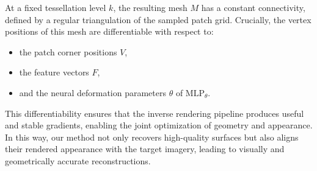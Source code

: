 At a fixed tessellation level $k$, the resulting mesh $M$ has a constant connectivity, defined by a regular triangulation of the sampled patch grid.  
Crucially, the vertex positions of this mesh are differentiable with respect to:
\begin{itemize}
    \item the patch corner positions $V$,
    \item the feature vectors $F$,
    \item and the neural deformation parameters $\theta$ of $\text{MLP}_\theta$.
\end{itemize}

This differentiability ensures that the inverse rendering pipeline produces useful and stable gradients, enabling the joint optimization of geometry and appearance.  
In this way, our method not only recovers high-quality surfaces but also aligns their rendered appearance with the target imagery, leading to visually and geometrically accurate reconstructions.  
